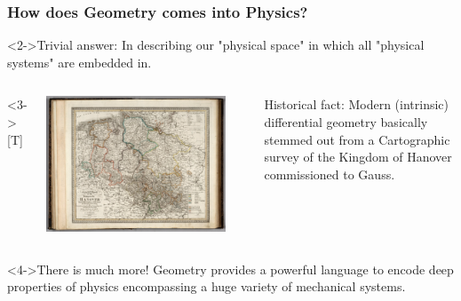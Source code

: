 \documentclass[8pt,handout]{beamer}
\begin{document}
	\begin{frame}
		\frametitle{How does Geometry comes into Physics?}
		\begin{block}<2->{Trivial answer:}
			In describing our "physical space" in which all "physical systems" are embedded in.
		\end{block}
  	\begin{columns}<3->[T]
    	\begin{column}{.5\textwidth}
    		\begin{center}
					\includegraphics[width=0.9\textwidth]{Pics/map} 		
    		\end{center}
    	\end{column}
    	\begin{column}{.5\textwidth}
    			\vspace*{1em}
				\begin{exampleblock}{Historical fact:}
					Modern (intrinsic) differential geometry basically stemmed out from a Cartographic survey of the Kingdom of Hanover commissioned to Gauss.			
				\end{exampleblock}
    	\end{column}
    \end{columns}

				\begin{alertblock}<4->{There is much more!}
					Geometry provides a powerful language to encode deep properties of physics encompassing a huge variety of mechanical systems.
				\end{alertblock}
	
	\end{frame}
\end{document}

